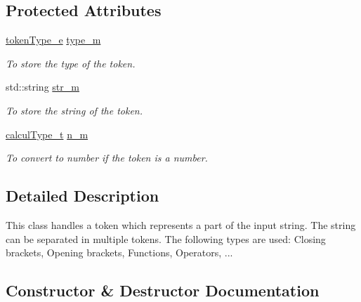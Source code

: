 \subsection*{Protected Attributes}
\begin{DoxyCompactItemize}
\item 
\hypertarget{class_token_a881316b1f7990524969817f25f80feae}{}\hyperlink{class_token_a706d105bff3282a406a9b218fcee1bfc}{token\+Type\+\_\+e} \hyperlink{class_token_a881316b1f7990524969817f25f80feae}{type\+\_\+m}\label{class_token_a881316b1f7990524969817f25f80feae}

\begin{DoxyCompactList}\small\item\em To store the type of the token. \end{DoxyCompactList}\item 
\hypertarget{class_token_a2781f7d67fae2fa1cbfe4af5caf8473d}{}std\+::string \hyperlink{class_token_a2781f7d67fae2fa1cbfe4af5caf8473d}{str\+\_\+m}\label{class_token_a2781f7d67fae2fa1cbfe4af5caf8473d}

\begin{DoxyCompactList}\small\item\em To store the string of the token. \end{DoxyCompactList}\item 
\hypertarget{class_token_ad881272523473f67bbeaecac8a99173a}{}\hyperlink{mpfr_interface_8h_a16492006127cd422340be2441c22c14b}{calcul\+Type\+\_\+t} \hyperlink{class_token_ad881272523473f67bbeaecac8a99173a}{n\+\_\+m}\label{class_token_ad881272523473f67bbeaecac8a99173a}

\begin{DoxyCompactList}\small\item\em To convert to number if the token is a number. \end{DoxyCompactList}\end{DoxyCompactItemize}


\subsection{Detailed Description}
This class handles a token which represents a part of the input string. The string can be separated in multiple tokens. The following types are used\+: Closing brackets, Opening brackets, Functions, Operators, ... 

\subsection{Constructor \& Destructor Documentation}
\hypertarget{class_token_ad84c27d6c4587fd359ffa52004bd370b}{}

